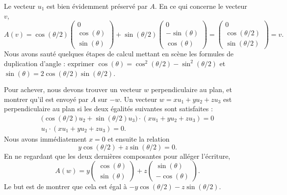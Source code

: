 \begin{subproof}
	Le vecteur \( u_1\) est bien évidemment préservé par \( A\). En ce qui concerne le vecteur \( v\),
	\begin{equation}
		A(v)=\cos(\theta/2)\begin{pmatrix}
			0            \\
			\cos(\theta) \\
			\sin(\theta)
		\end{pmatrix}+\sin(\theta/2)\begin{pmatrix}
			0             \\
			-\sin(\theta) \\
			\cos(\theta)
		\end{pmatrix}=
		\begin{pmatrix}
			0              \\
			\cos(\theta/2) \\
			\sin(\theta/2)
		\end{pmatrix}=v.
	\end{equation}
	Nous avons sauté quelques étapes de calcul mettant en scène les formules de duplication d'angle : exprimer \( \cos(\theta)=\cos^2(\theta/2)-\sin^2(\theta/2)\) et \( \sin(\theta)=2\cos(\theta/2)\sin(\theta/2)\).

	Pour achever, nous devons trouver un vecteur \( w\) perpendiculaire au plan, et montrer qu'il est envoyé par \( A\) sur \( -w\). Un vecteur \( w=xu_1+yu_2+zu_3\) est perpendiculaire au plan si les deux égalités suivantes sont satisfaites :
	\begin{subequations}
		\begin{align}
			\big( \cos(\theta/2)u_2+\sin(\theta/2)u_3 \big)\cdot (xu_1+yu_2+zu_3)=0 \\
			u_1\cdot(xu_1+yu_2+zu_3)=0.
		\end{align}
	\end{subequations}
	Nous avons immédiatement \( x=0\) et ensuite la relation
	\begin{equation}        \label{EQooXQMDooTvwrWk}
		y\cos(\theta/2)+z\sin(\theta/2)=0.
	\end{equation}
	En ne regardant que les deux dernières composantes pour alléger l'écriture,
	\begin{equation}
		A(w)=y\begin{pmatrix}
			\cos(\theta) \\
			\sin(\theta)
		\end{pmatrix}+z\begin{pmatrix}
			\sin(\theta) \\
			-\cos(\theta)
		\end{pmatrix}.
	\end{equation}
	Le but est de montrer que cela est égal à \( -y\cos(\theta/2)-z\sin(\theta/2)\).


\end{subproof}
